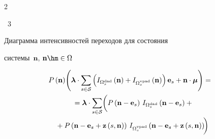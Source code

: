 \begin{multicols}{2}
{\begin{center}
\end{center}











\noindent


{{\figurename~3}\ \ \small{Диаграмма интенсивностей переходов для состояния 


системы~$\mathbf{n}$, $\mathbf{n}\hm\in\Omega$


}}}










\addtocounter{figure}{1}





\noindent


\begin{multline*}




\!\!\!\! P\left(\mathbf{n}\right)\! \left( \boldsymbol\lambda \cdot 


\sum_{s\in\mathcal{S}}{\left( I_{\Omega_s^{\mathrm{dad}}}\left(\mathbf{n}\right) + 


I_{\Omega_s^{\mathrm{vpad}}}\left(\mathbf{n}\right) \right) \mathbf{e}_s + 


\mathbf{n}\cdot\boldsymbol\mu} \right) = {}\hspace*{-2.69116pt}\\


{}= \boldsymbol\lambda \cdot \sum_{s\in\mathcal{S}}


\biggl(


P\left(\mathbf{n}-\mathbf{e}_s\right)\, 


I_{\Omega_s^{\mathrm{dad}}}\left(\mathbf{n}-\mathbf{e}_s\right) + {}\hspace*{-2.69116pt}\\


{}+ P\left(\mathbf{n}-\mathbf{e}_s+\mathbf{z}\left(s,\mathbf{n}\right)\right)\, 


I_{\Omega_s^{\mathrm{vpad}}}\left(\mathbf{n}-


\mathbf{e}_s+\mathbf{z}\left(s,\mathbf{n}\right)\right)\!\!


\biggl)



\end{multline*}
\end{multicols}
